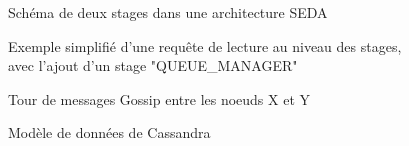 \documentclass[12pt]{article}
\begin{document}
\newpage

\begin{figure}[p]
	\centering
		
	\caption{Schéma de deux stages dans une architecture SEDA \label{fig:stages}}
\end{figure}

\begin{figure}[p]
	\centering
		
	\caption{Exemple simplifié d'une requête de lecture au niveau des stages, avec l'ajout d'un stage "QUEUE\_MANAGER" \label{fig:read_request}}
\end{figure}

\begin{figure}[p]
	\centering
		
	\caption{Tour de messages Gossip entre les noeuds X et Y \label{fig:round_gossip}}
\end{figure}

\begin{figure}[p]
	\centering
		
	\caption{Modèle de données de Cassandra \label{fig:keyspace}}
\end{figure}
\end{document}
